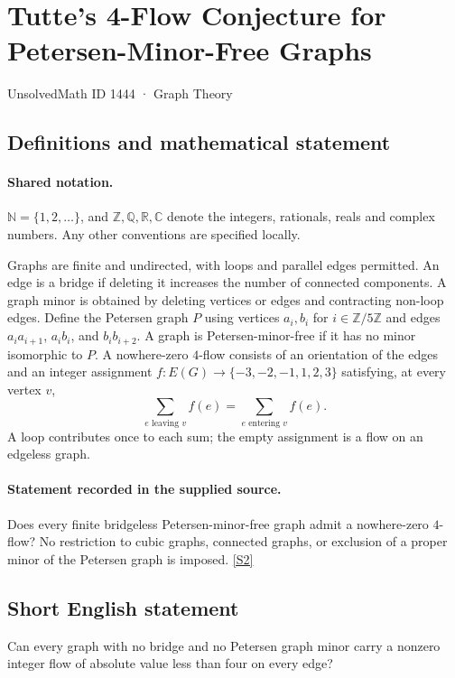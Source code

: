 \documentclass[11pt]{article}
\newcommand{\sref}[2]{\hyperlink{source:#1:#2}{[S#2]}}
\begin{document}
\setcounter{section}{1443}
\section{Tutte's 4-Flow Conjecture for Petersen-Minor-Free Graphs}\label{1444}
{\small\sffamily UnsolvedMath ID 1444 · Graph Theory}
\subsection{Definitions and mathematical statement}

\paragraph{Shared notation.}$\mathbb N=\{1,2,\ldots\}$, and $\mathbb Z,\mathbb Q,\mathbb R,\mathbb C$ denote the integers, rationals, reals and complex numbers. Any other conventions are specified locally.


Graphs are finite and undirected, with loops and parallel edges permitted. An edge is a bridge if deleting it increases the number of connected components. A graph minor is obtained by deleting vertices or edges and contracting non-loop edges. Define the Petersen graph $P$ using vertices $a_i,b_i$ for $i\in\mathbb Z/5\mathbb Z$ and edges $a_ia_{i+1}$, $a_ib_i$, and $b_ib_{i+2}$. A graph is Petersen-minor-free if it has no minor isomorphic to $P$. A nowhere-zero $4$-flow consists of an orientation of the edges and an integer assignment $f:E(G)\to\{-3,-2,-1,1,2,3\}$ satisfying, at every vertex $v$,
\[
 \sum_{e\text{ leaving }v}f(e)=\sum_{e\text{ entering }v}f(e).
\]
A loop contributes once to each sum; the empty assignment is a flow on an edgeless graph.
\paragraph{Statement recorded in the supplied source.}
Does every finite bridgeless Petersen-minor-free graph admit a nowhere-zero $4$-flow? No restriction to cubic graphs, connected graphs, or exclusion of a proper minor of the Petersen graph is imposed. \sref{1444}{2}
\subsection{Short English statement}
Can every graph with no bridge and no Petersen graph minor carry a nonzero integer flow of absolute value less than four on every edge?
\end{document}
